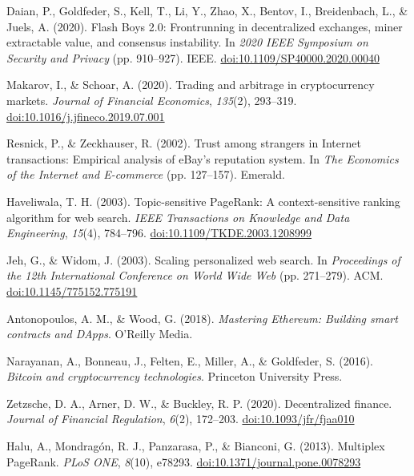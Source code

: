 \begin{enumerate}[label={[\arabic*]}, leftmargin=*, itemsep=0.35em, parsep=0pt]
  \item{}\label{ref:54} Daian, P., Goldfeder, S., Kell, T., Li, Y., Zhao, X., Bentov, I., Breidenbach, L., \& Juels, A. (2020). Flash Boys 2.0: Frontrunning in decentralized exchanges, miner extractable value, and consensus instability. In \textit{2020 IEEE Symposium on Security and Privacy} (pp. 910--927). IEEE. \href{https://doi.org/10.1109/SP40000.2020.00040}{doi:10.1109/SP40000.2020.00040}
  \item{}\label{ref:55} Makarov, I., \& Schoar, A. (2020). Trading and arbitrage in cryptocurrency markets. \textit{Journal of Financial Economics}, \textit{135}(2), 293--319. \href{https://doi.org/10.1016/j.jfineco.2019.07.001}{doi:10.1016/j.jfineco.2019.07.001}
  \item{}\label{ref:56} Resnick, P., \& Zeckhauser, R. (2002). Trust among strangers in Internet transactions: Empirical analysis of eBay's reputation system. In \textit{The Economics of the Internet and E-commerce} (pp. 127--157). Emerald.
  \item{}\label{ref:57} Haveliwala, T. H. (2003). Topic-sensitive PageRank: A context-sensitive ranking algorithm for web search. \textit{IEEE Transactions on Knowledge and Data Engineering}, \textit{15}(4), 784--796. \href{https://doi.org/10.1109/TKDE.2003.1208999}{doi:10.1109/TKDE.2003.1208999}
  \item{}\label{ref:58} Jeh, G., \& Widom, J. (2003). Scaling personalized web search. In \textit{Proceedings of the 12th International Conference on World Wide Web} (pp. 271--279). ACM. \href{https://doi.org/10.1145/775152.775191}{doi:10.1145/775152.775191}
  \item{}\label{ref:59} Antonopoulos, A. M., \& Wood, G. (2018). \textit{Mastering Ethereum: Building smart contracts and DApps}. O'Reilly Media.
  \item{}\label{ref:60} Narayanan, A., Bonneau, J., Felten, E., Miller, A., \& Goldfeder, S. (2016). \textit{Bitcoin and cryptocurrency technologies}. Princeton University Press.
  \item{}\label{ref:61} Zetzsche, D. A., Arner, D. W., \& Buckley, R. P. (2020). Decentralized finance. \textit{Journal of Financial Regulation}, \textit{6}(2), 172--203. \href{https://doi.org/10.1093/jfr/fjaa010}{doi:10.1093/jfr/fjaa010}
  \item{}\label{ref:62} Halu, A., Mondrag\'{o}n, R. J., Panzarasa, P., \& Bianconi, G. (2013). Multiplex PageRank. \textit{PLoS ONE}, \textit{8}(10), e78293. \href{https://doi.org/10.1371/journal.pone.0078293}{doi:10.1371/journal.pone.0078293}

\end{enumerate}
